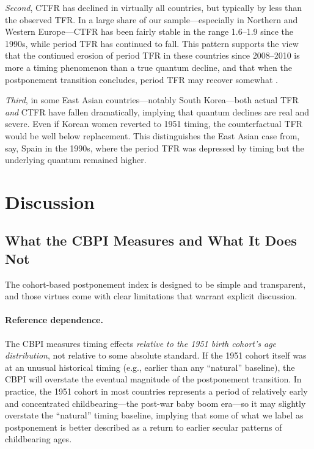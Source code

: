 \documentclass[12pt]{article}
\begin{document}
\emph{Second}, CTFR has declined in virtually all countries, but
typically by less than the observed TFR.  In a large share of our
sample---especially in Northern and Western Europe---CTFR has been
fairly stable in the range 1.6--1.9 since the 1990s, while period TFR
has continued to fall.  This pattern supports the view that the
continued erosion of period TFR in these countries since 2008--2010 is
more a timing phenomenon than a true quantum decline, and that when
the postponement transition concludes, period TFR may recover somewhat
\citep{Goldscheider2015}.

\emph{Third}, in some East Asian countries---notably South Korea---both
actual TFR \emph{and} CTFR have fallen dramatically, implying
that quantum declines are real and severe.  Even if Korean women
reverted to 1951 timing, the counterfactual TFR would be well below
replacement.  This distinguishes the East Asian case from, say, Spain
in the 1990s, where the period TFR was depressed by timing but the
underlying quantum remained higher.


\section{Discussion}
\label{sec:discussion}

\subsection{What the CBPI Measures and What It Does Not}

The cohort-based postponement index is designed to be simple and
transparent, and those virtues come with clear limitations that
warrant explicit discussion.

\paragraph{Reference dependence.}
The CBPI measures timing effects \emph{relative to the 1951 birth
cohort's age distribution}, not relative to some absolute standard.
If the 1951 cohort itself was at an unusual historical timing
(e.g., earlier than any ``natural'' baseline), the CBPI will overstate
the eventual magnitude of the postponement transition.  In practice,
the 1951 cohort in most countries represents a period of relatively
early and concentrated childbearing---the post-war baby boom era---so
it may slightly overstate the ``natural'' timing baseline, implying
that some of what we label as postponement is better described as a
return to earlier secular patterns of childbearing ages.
\end{document}
